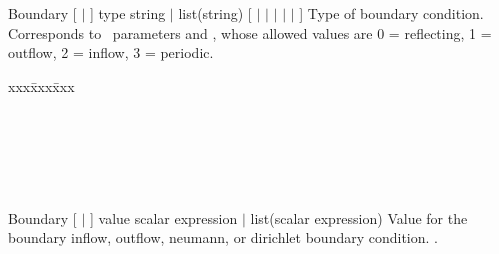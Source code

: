 \documentclass{book}
\begin{document}



\section{}

\Parameter
{Boundary}
{[  $|$  ]}
{type}
{string $|$ list(string)}
{ [  $|$ $|$ $|$
  $|$ $|$  ] }
{ Type of boundary condition.  Corresponds to \enzo\ parameters
   and
  , whose allowed values are 0 = reflecting, 1 = outflow, 2 = inflow, 3 = periodic.}
{
\begin{tabbing}
xxx\=xxx\=xxx\kill
  \\
\> \\
\>    \\
\>    \\
\>\>       \\
\>   \code{\}} \\
\code{\}}
\end{tabbing}
}
{}

\Parameter
{Boundary}
{[  $|$  ]}
{value}
{scalar expression $|$ list(scalar expression) }
{}
{ Value for the boundary inflow, outflow, neumann, or dirichlet
  boundary condition.   .}
{}
\end{document}
